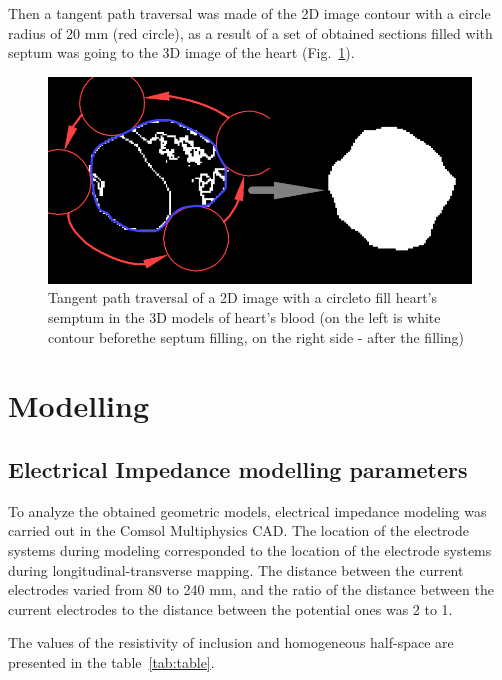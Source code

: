 \documentclass[conference]{IEEEtran}
\begin{document}
Then a tangent path traversal was made of the 2D image contour with a circle radius of
20 mm (red circle), as a result of a set of obtained sections filled with septum
was going to the 3D image of the heart (Fig.~\ref{fig:algo2}).

\begin{figure}[tbph]
    \centering
    \includegraphics[width=0.9\linewidth]{fig/algo2}
    \caption{Tangent path traversal of a 2D image with a circleto fill heart's semptum
    in the 3D models of heart's blood (on the left is white contour beforethe septum filling,
        on the right side - after the filling)}
    \label{fig:algo2}
\end{figure}

\section{Modelling}
\subsection{Electrical Impedance modelling parameters}
To analyze the obtained geometric models, electrical impedance modeling was
carried out in the Comsol Multiphysics CAD. The location of the electrode
systems during modeling corresponded to the location of the electrode systems
during longitudinal-transverse mapping. The distance between the current
electrodes varied from 80 to 240 mm, and the ratio of the distance between the
current electrodes to the distance between the potential ones was 2 to 1.

The values of the resistivity of inclusion and homogeneous half-space are presented in the table~\ref{tab:table}.
\end{document}
